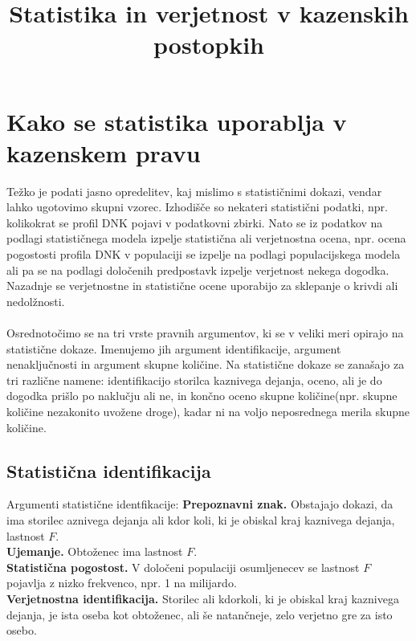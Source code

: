 \documentclass[a4paper,12pt]{article}
\begin{document}
\title{Statistika in verjetnost v kazenskih postopkih}
\maketitle

\section{Kako se statistika uporablja v kazenskem pravu}
Težko je podati jasno opredelitev, kaj mislimo s statističnimi dokazi, vendar lahko ugotovimo skupni vzorec. Izhodišče so nekateri statistični 
podatki, npr. kolikokrat se profil DNK pojavi v podatkovni zbirki. Nato se iz podatkov na podlagi statističnega modela izpelje statistična ali 
verjetnostna ocena, npr. ocena pogostosti profila DNK v populaciji se izpelje na podlagi populacijskega modela ali pa se na podlagi določenih 
predpostavk izpelje verjetnost nekega dogodka. Nazadnje se verjetnostne in statistične ocene uporabijo za sklepanje o krivdi ali nedolžnosti. \\ \\

Osrednotočimo se na tri vrste pravnih argumentov, ki se v veliki meri opirajo na statistične dokaze. Imenujemo jih argument identifikacije, 
argument nenaključnosti in argument skupne količine. Na statistične dokaze se zanašajo za tri različne namene: identifikacijo storilca 
kaznivega dejanja, oceno, ali je do dogodka prišlo po naklučju ali ne, in končno oceno skupne količine(npr. skupne količine nezakonito 
uvožene droge), kadar ni na voljo neposrednega merila skupne količine.

\subsection{Statistična identifikacija}
Argumenti statistične identfikacije:
\textbf{Prepoznavni znak.} Obstajajo dokazi, da ima storilec aznivega dejanja ali kdor koli, ki je obiskal kraj kaznivega dejanja, lastnost $F$. \\
\textbf{Ujemanje.} Obtoženec ima lastnost $F$. \\
\textbf{Statistična pogostost.} V določeni populaciji osumljenecev se lastnost $F$ pojavlja z nizko frekvenco, npr. 1 na milijardo. \\
\textbf{Verjetnostna identifikacija.} Storilec ali kdorkoli, ki je obiskal kraj kaznivega dejanja, je ista oseba kot obtoženec, ali še natančneje, 
zelo verjetno gre za isto osebo.
\end{document}

